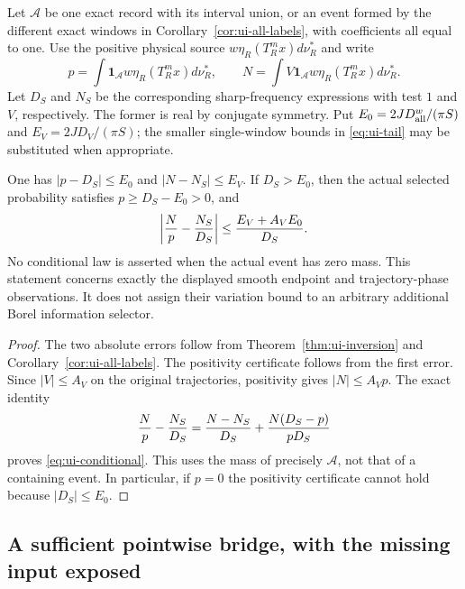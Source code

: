 Let $\mathcal A$ be one exact record with its interval union, or an
event formed by the different exact windows in
Corollary~\ref{cor:ui-all-labels}, with coefficients all equal to one.
Use the positive physical source $w\eta_R(T_R^mx)d\nu_R^*$ and
write
\[
 p=\int\mathbf1_{\mathcal A}w\eta_R(T_R^mx)d\nu_R^*,\qquad
 N=\int V\mathbf1_{\mathcal A}w\eta_R(T_R^mx)d\nu_R^*.
\]
Let $D_S$ and $N_S$ be the corresponding sharp-frequency expressions
with test $1$ and $V$, respectively.  The former is real by conjugate
symmetry.  Put $E_0=2JD_{\rm all}^w/(\pi S)$ and
$E_V=2JD_V/(\pi S)$; the smaller single-window bounds in
\eqref{eq:ui-tail} may be substituted when appropriate.

\begin{proposition}
\label{prop:ui-conditional}
One has $|p-D_S|\le E_0$ and $|N-N_S|\le E_V$.
If $D_S>E_0$, then the actual selected probability satisfies
$p\ge D_S-E_0>0$, and
\begin{equation}\label{eq:ui-conditional}
 \left|{N\over p}-{N_S\over D_S}\right|
       \le {E_V+A_VE_0\over D_S}.
\end{equation}
No conditional law is asserted when the actual event has zero mass.
This statement concerns exactly the displayed smooth endpoint and
trajectory-phase observations.  It does not assign their variation
bound to an arbitrary additional Borel information selector.
\end{proposition}
\begin{proof}
The two absolute errors follow from Theorem~\ref{thm:ui-inversion}
and Corollary~\ref{cor:ui-all-labels}.  The positivity certificate
follows from the first error.  Since $|V|\le A_V$ on the original
trajectories, positivity gives $|N|\le A_Vp$.  The exact identity
\[
 {N\over p}-{N_S\over D_S}
       ={N-N_S\over D_S}+{N(D_S-p)\over pD_S}
\]
proves \eqref{eq:ui-conditional}.  This uses the mass of precisely
$\mathcal A$, not that of a containing event.  In particular,
if $p=0$ the positivity certificate cannot hold because
$|D_S|\le E_0$.
\end{proof}

\subsection{A sufficient pointwise bridge, with the missing input exposed}

